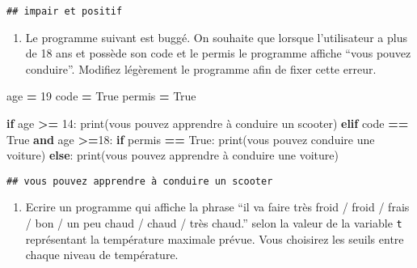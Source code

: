 \documentclass[
]{book}
\newenvironment{Shaded}{\begin{snugshade}}{\end{snugshade}}
\newcommand{\BuiltInTok}[1]{#1}
\newcommand{\ControlFlowTok}[1]{\textcolor[rgb]{0.13,0.29,0.53}{\textbf{#1}}}
\newcommand{\DecValTok}[1]{\textcolor[rgb]{0.00,0.00,0.81}{#1}}
\newcommand{\KeywordTok}[1]{\textcolor[rgb]{0.13,0.29,0.53}{\textbf{#1}}}
\newcommand{\NormalTok}[1]{#1}
\newcommand{\OperatorTok}[1]{\textcolor[rgb]{0.81,0.36,0.00}{\textbf{#1}}}
\newcommand{\StringTok}[1]{\textcolor[rgb]{0.31,0.60,0.02}{#1}}
\newcommand{\VariableTok}[1]{\textcolor[rgb]{0.00,0.00,0.00}{#1}}
\providecommand{\tightlist}{%
  \setlength{\itemsep}{0pt}\setlength{\parskip}{0pt}}
\def\tightlist{}
\begin{document}
\begin{verbatim}
## impair et positif
\end{verbatim}

\begin{enumerate}
\def\labelenumi{\arabic{enumi}.}
\setcounter{enumi}{3}
\tightlist
\item
  Le programme suivant est buggé. On souhaite que lorsque l'utilisateur a plus de 18 ans et possède son code et le permis le programme affiche ``vous pouvez conduire''. Modifiez légèrement le programme afin de fixer cette erreur.
\end{enumerate}

\begin{Shaded}
\begin{Highlighting}[]
\NormalTok{age }\OperatorTok{=} \DecValTok{19}
\NormalTok{code }\OperatorTok{=} \VariableTok{True}
\NormalTok{permis }\OperatorTok{=} \VariableTok{True}

\ControlFlowTok{if}\NormalTok{ age }\OperatorTok{\textgreater{}=} \DecValTok{14}\NormalTok{:}
    \BuiltInTok{print}\NormalTok{(}\StringTok{\textquotesingle{}vous pouvez apprendre à conduire un scooter\textquotesingle{}}\NormalTok{)}
\ControlFlowTok{elif}\NormalTok{ code }\OperatorTok{==} \VariableTok{True} \KeywordTok{and}\NormalTok{ age }\OperatorTok{\textgreater{}=}\DecValTok{18}\NormalTok{:}
    \ControlFlowTok{if}\NormalTok{ permis }\OperatorTok{==} \VariableTok{True}\NormalTok{:}
        \BuiltInTok{print}\NormalTok{(}\StringTok{\textquotesingle{}vous pouvez conduire une voiture\textquotesingle{}}\NormalTok{)}
    \ControlFlowTok{else}\NormalTok{:}
        \BuiltInTok{print}\NormalTok{(}\StringTok{\textquotesingle{}vous pouvez apprendre à conduire une voiture\textquotesingle{}}\NormalTok{)}
\end{Highlighting}
\end{Shaded}

\begin{verbatim}
## vous pouvez apprendre à conduire un scooter
\end{verbatim}

\begin{enumerate}
\def\labelenumi{\arabic{enumi}.}
\setcounter{enumi}{3}
\tightlist
\item
  Ecrire un programme qui affiche la phrase ``il va faire très froid / froid / frais / bon / un peu chaud / chaud / très chaud.'' selon la valeur de la variable \texttt{t} représentant la température maximale prévue. Vous choisirez les seuils entre chaque niveau de température.
\end{enumerate}
\end{document}
